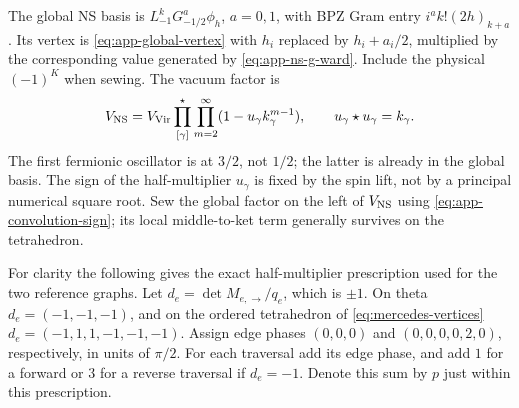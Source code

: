 The global NS basis is $L_{-1}^kG_{-1/2}^a\phi_h$, $a=0,1$,
with BPZ Gram entry $i^a k!(2h)_{k+a}$. Its vertex is
\eqref{eq:app-global-vertex} with $h_i$ replaced by $h_i+a_i/2$,
multiplied by the corresponding value generated by
\eqref{eq:app-ns-g-ward}.
Include the physical $(-1)^K$ when sewing. The vacuum factor is
\begin{equation}
 V_{\mathrm{NS}}=V_{\mathrm{Vir}}
  \prod_{[\gamma]}^{\star}\prod_{m=2}^{\infty}
             (1-u_\gamma k_\gamma^{m-1}),
 \qquad u_\gamma\star u_\gamma=k_\gamma.
 \label{eq:app-ns-vacuum}
\end{equation}
The first fermionic oscillator is at $3/2$, not $1/2$; the latter is
already in the global basis. The sign of the half-multiplier $u_\gamma$
is fixed by the spin lift, not by a principal numerical square root.
Sew the global factor on the left of $V_{\mathrm{NS}}$ using
\eqref{eq:app-convolution-sign}; its local middle-to-ket term generally survives
on the tetrahedron.

For clarity the following gives the exact half-multiplier prescription
used for the two reference graphs. Let $d_e=\det M_{e,\to}/q_e$,
which is $\pm1$. On theta $d_e=(-1,-1,-1)$, and on the ordered
tetrahedron of \eqref{eq:mercedes-vertices}
$d_e=(-1,1,1,-1,-1,-1)$. Assign edge phases
$(0,0,0)$ and $(0,0,0,0,2,0)$, respectively, in units of $\pi/2$.
For each traversal add its edge phase, and add $1$ for a forward or
$3$ for a reverse traversal if $d_e=-1$. Denote this sum by $p$ just
within this prescription.

